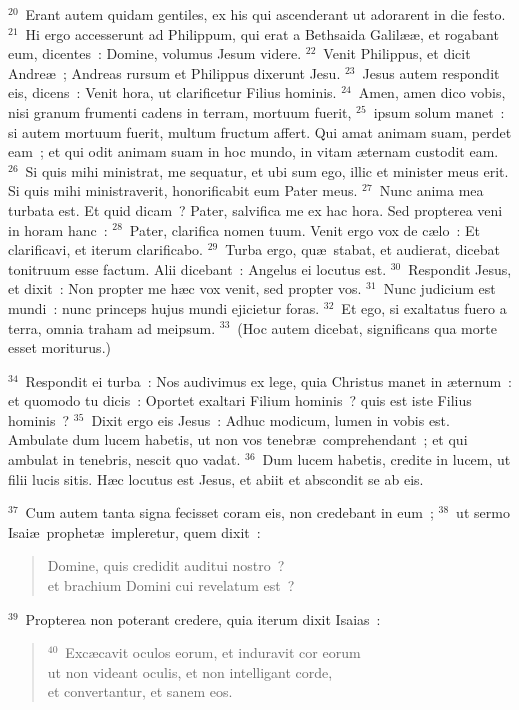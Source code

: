 ${}^{20}$~Erant autem quidam gentiles, ex his qui ascenderant ut adorarent in die festo.
${}^{21}$~Hi ergo accesserunt ad Philippum, qui erat a Bethsaida Galil\ae \ae , et rogabant eum, dicentes~: Domine, volumus Jesum videre.
${}^{22}$~Venit Philippus, et dicit Andre\ae~; Andreas rursum et Philippus dixerunt Jesu.
${}^{23}$~Jesus autem respondit eis, dicens~: Venit hora, ut clarificetur Filius hominis.
${}^{24}$~Amen, amen dico vobis, nisi granum frumenti cadens in terram, mortuum fuerit,
${}^{25}$~ipsum solum manet~: si autem mortuum fuerit, multum fructum affert. Qui amat animam suam, perdet eam~; et qui odit animam suam in hoc mundo, in vitam \ae ternam custodit eam.
${}^{26}$~Si quis mihi ministrat, me sequatur, et ubi sum ego, illic et minister meus erit. Si quis mihi ministraverit, honorificabit eum Pater meus.
${}^{27}$~Nunc anima mea turbata est. Et quid dicam~? Pater, salvifica me ex hac hora. Sed propterea veni in horam hanc~:
${}^{28}$~Pater, clarifica nomen tuum. Venit ergo vox de c\ae lo~: Et clarificavi, et iterum clarificabo.
${}^{29}$~Turba ergo, qu\ae\ stabat, et audierat, dicebat tonitruum esse factum. Alii dicebant~: Angelus ei locutus est.
${}^{30}$~Respondit Jesus, et dixit~: Non propter me h\ae c vox venit, sed propter vos.
${}^{31}$~Nunc judicium est mundi~: nunc princeps hujus mundi ejicietur foras.
${}^{32}$~Et ego, si exaltatus fuero a terra, omnia traham ad meipsum.
${}^{33}$~(Hoc autem dicebat, significans qua morte esset moriturus.)


${}^{34}$~Respondit ei turba~: Nos audivimus ex lege, quia Christus manet in \ae ternum~: et quomodo tu dicis~: Oportet exaltari Filium hominis~? quis est iste Filius hominis~?
${}^{35}$~Dixit ergo eis Jesus~: Adhuc modicum, lumen in vobis est. Ambulate dum lucem habetis, ut non vos tenebr\ae\ comprehendant~; et qui ambulat in tenebris, nescit quo vadat.
${}^{36}$~Dum lucem habetis, credite in lucem, ut filii lucis sitis. H\ae c locutus est Jesus, et abiit et abscondit se ab eis.


${}^{37}$~Cum autem tanta signa fecisset coram eis, non credebant in eum~;
${}^{38}$~ut sermo Isai\ae\ prophet\ae\ impleretur, quem dixit~: \begin{verse}Domine, quis credidit auditui nostro~?\\ et brachium Domini cui revelatum est~?\end{verse}


${}^{39}$~Propterea non poterant credere, quia iterum dixit Isaias~:
\begin{verse}${}^{40}$~Exc\ae cavit oculos eorum, et induravit cor eorum\\ ut non videant oculis, et non intelligant corde,\\ et convertantur, et sanem eos.\end{verse}


